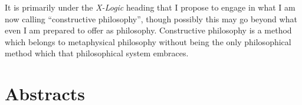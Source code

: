 \documentclass[numreferences]{rbjk}
\begin{document}
\begin{article}
It is primarily under the {\it X-Logic} heading that I propose to engage in what I am now calling ``constructive philosophy'', though possibly this may go beyond what even I am prepared to offer as philosophy.
Constructive philosophy is a method which belongs to metaphysical philosophy without being the only philosophical method which that philosophical system embraces.

\section{Abstracts}



%

{\raggedright


} %


\end{article}
\end{document}

